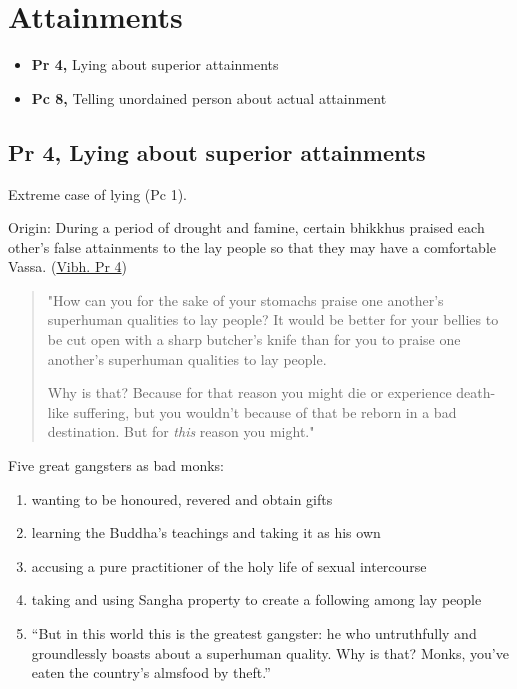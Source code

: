 \chapter{Attainments}

\begin{itemize}
\tightlist
\item
  \textbf{Pr 4,} Lying about superior attainments
\item
  \textbf{Pc 8,} Telling unordained person about actual attainment
\end{itemize}


\section{Pr 4, Lying about superior attainments}

Extreme case of lying (Pc 1).

Origin: During a period of drought and famine, certain bhikkhus praised
each other's false attainments to the lay people so that they may have a
comfortable Vassa.
(\href{https://suttacentral.net/pli-tv-bu-vb-pj4/en/brahmali}{Vibh. Pr
4})

\begin{quote}
"How can you for the sake of your stomachs praise one another's
superhuman qualities to lay people? It would be better for your bellies
to be cut open with a sharp butcher's knife than for you to praise one
another's superhuman qualities to lay people.

Why is that? Because for that reason you might die or experience
death-like suffering, but you wouldn't because of that be reborn in a
bad destination. But for \emph{this} reason you might."
\end{quote}

\clearpage

Five great gangsters as bad monks:

\begin{enumerate}
\def\labelenumi{\arabic{enumi}.}
\tightlist
\item
  wanting to be honoured, revered and obtain gifts
\item
  learning the Buddha's teachings and taking it as his own
\item
  accusing a pure practitioner of the holy life of sexual intercourse
\item
  taking and using Sangha property to create a following among lay
  people
\item
  ``But in this world this is the greatest gangster: he who untruthfully
  and groundlessly boasts about a superhuman quality. Why is that?
  Monks, you've eaten the country's almsfood by theft.''
\end{enumerate}

